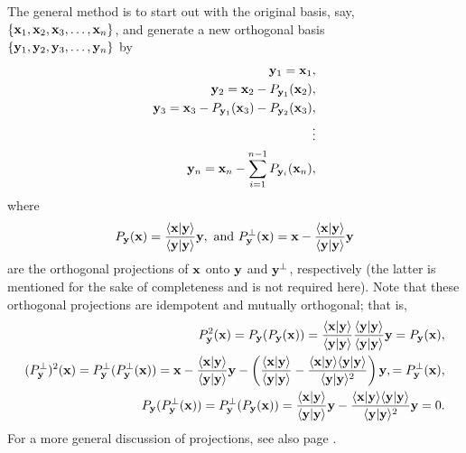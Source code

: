 The general method is to start out with the original basis,
say,  \\
$\{
{\bf x}_1,
{\bf x}_2,
{\bf x}_3,
\ldots ,
{\bf x}_n
\}$,
and generate a new orthogonal basis \\
$\{
{\bf y}_1,
{\bf y}_2,
{\bf y}_3,
\ldots ,
{\bf y}_n
\}$
by
\begin{equation}
\begin{split}
{\bf y}_1={\bf x}_1,\\
{\bf y}_2={\bf x}_2 - P_{{\bf y}_1}({\bf x}_2),\\
{\bf y}_3={\bf x}_3 - P_{{\bf y}_1}({\bf x}_3)- P_{{\bf y}_2}({\bf x}_3),\\
 \vdots \\
{\bf y}_n={\bf x}_n -\sum_{i=1}^{n-1} P_{{\bf y}_i}({\bf x}_n),
\end{split}
\end{equation}
where
\begin{equation}
P_{{\bf y}}({\bf x}) =
\frac{\langle {\bf x}\vert {\bf y} \rangle }
{\langle {\bf y}\vert {\bf y} \rangle }
{\bf y}
,\textrm{ and }
P_{{\bf y}}^\perp ({\bf x}) = {\bf x} -
\frac{\langle {\bf x}\vert {\bf y} \rangle }
{\langle {\bf y}\vert {\bf y} \rangle }
{\bf y}
\end{equation}
are the orthogonal projections of ${\bf x}$ onto ${\bf y}$ and ${\bf y}^\perp$, respectively
(the latter is mentioned for the sake of completeness and is not required here).
\label{2011-m-gsp}
Note that these orthogonal projections are idempotent
and mutually orthogonal; that is,
\begin{equation}
\begin{split}
P_{{\bf y}}^2({\bf x})  = P_{{\bf y}}(P_{{\bf y}}({\bf x}) ) =
\frac{\langle {\bf x}\vert {\bf y} \rangle }
{\langle {\bf y}\vert {\bf y} \rangle }
\frac{\langle {\bf y}\vert {\bf y} \rangle }
{\langle {\bf y}\vert {\bf y} \rangle }
{\bf y} =P_{{\bf y}}({\bf x}),  \\
%
(P_{{\bf y}}^\perp)^2({\bf x})  = P_{{\bf y}}^\perp(P_{{\bf y}}^\perp({\bf x}) ) =
{\bf x}- \frac{\langle {\bf x}\vert {\bf y} \rangle }{\langle {\bf y}\vert {\bf y} \rangle }{\bf y}
-\left(
\frac{\langle {\bf x}\vert {\bf y} \rangle }{\langle {\bf y}\vert {\bf y} \rangle }
-
\frac{\langle {\bf x}\vert {\bf y} \rangle \langle {\bf y}\vert {\bf y}
\rangle}{\langle {\bf y}\vert {\bf y} \rangle^2 }
\right)
{\bf y},
=P_{{\bf y}}^\perp({\bf x}),  \\
P_{{\bf y}}(P_{{\bf y}}^\perp({\bf x}) ) =  P_{{\bf y}}^\perp(P_{{\bf y}}({\bf x}) ) =
\frac{\langle {\bf x}\vert {\bf y} \rangle }{\langle {\bf y}\vert {\bf y} \rangle }{\bf y}
-
\frac{\langle {\bf x}\vert {\bf y} \rangle \langle {\bf y}\vert {\bf y} \rangle}{\langle {\bf y}\vert {\bf y} \rangle^2 }
{\bf y}
=0.
\end{split}
\end{equation}
For a more general discussion of projections, see also page \pageref{2011-m-projec}.

